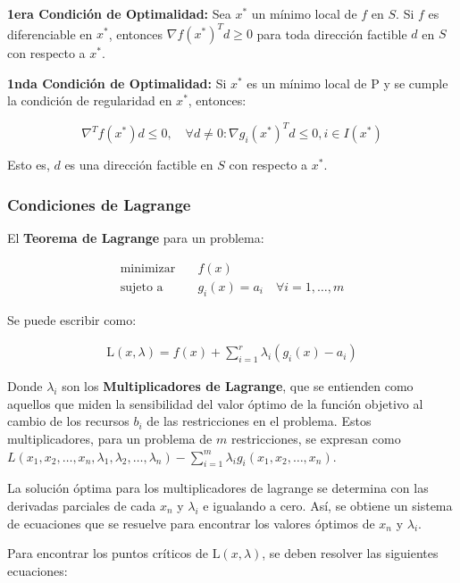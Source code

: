 \documentclass{article}
\begin{document}
\textbf{1era Condición de Optimalidad:} Sea $x^*$ un mínimo local de $f$ en $S$. Si $f$ es diferenciable en $x^*$, entonces $\nabla f(x^*)^T d \geq 0$ para toda dirección factible $d$ en $S$ con respecto a $x^*$.

\textbf{1nda Condición de Optimalidad:} Si $x^*$ es un mínimo local de P y se cumple la condición de regularidad en $x^*$, entonces:

\begin{equation*}
    \nabla^T f(x^*) d \leq 0, \quad \forall d\neq 0: \nabla g_i(x^*)^T d \leq 0, i\in I(x^*)
\end{equation*}

Esto es, $d$ es una dirección factible en $S$ con respecto a $x^*$.

\subsubsection{Condiciones de Lagrange}

El \textbf{Teorema de Lagrange} para un problema:

\begin{align*}
    \text{minimizar} \quad & f(x)                                        \\
    \text{sujeto a} \quad  & g_i(x) = a_i \quad \forall i = 1, \ldots, m
\end{align*}

Se puede escribir como:

\begin{align*}
    \mathrm{L}(x, \lambda) = f(x) + \sum_{i=1}^r \lambda_i (g_i(x) - a_i)
\end{align*}

Donde $\lambda_i$ son los \textbf{Multiplicadores de Lagrange}, que se entienden como aquellos que miden la sensibilidad del valor óptimo de la función objetivo al cambio de los recursos $b_i$ de las restricciones en el problema. Estos multiplicadores, para un problema de $m$ restricciones, se expresan como $L(x_1, x_2, \dots, x_n, \lambda_1, \lambda_2, \dots, \lambda_n) - \sum_{i=1}^{m} \lambda_i g_i(x_1,x_2,\dots,x_n)$.

La solución óptima para los multiplicadores de lagrange se determina con las derivadas parciales de cada $x_n$ y $\lambda_i$ e igualando a cero. Así, se obtiene un sistema de ecuaciones que se resuelve para encontrar los valores óptimos de $x_n$ y $\lambda_i$.

Para encontrar los puntos críticos de $\mathrm{L}(x, \lambda)$, se deben resolver las siguientes ecuaciones:
\end{document}
